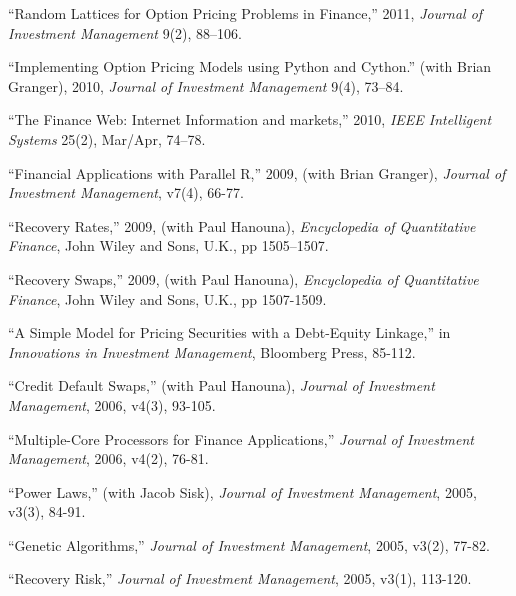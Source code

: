 \documentclass{article}
\begin{document}
\begin{etaremune}
\item ``Random Lattices for Option Pricing Problems in Finance,'' 2011, {\it Journal of Investment Management} 9(2), 88--106. 

\item ``Implementing Option Pricing Models using Python and Cython.''
(with Brian Granger), 2010, {\it Journal of Investment Management} 9(4), 73--84. 


\item ``The Finance Web: Internet Information and markets,'' 2010, {\it IEEE Intelligent Systems} 25(2), Mar/Apr, 74--78. 

\item ``Financial Applications with Parallel R,'' 2009, (with Brian Granger), {\it Journal of Investment Management}, v7(4), 66-77. 	

\item ``Recovery Rates,'' 2009, (with Paul Hanouna),
{\it Encyclopedia of Quantitative Finance}, John Wiley and Sons, U.K., pp 1505--1507.  

\item ``Recovery Swaps,'' 2009, (with Paul Hanouna), 
{\it Encyclopedia of Quantitative Finance}, John Wiley and Sons, U.K., pp 1507-1509.  

\item ``A Simple Model for Pricing Securities with a Debt-Equity Linkage,'' in 
{\it Innovations in Investment Management}, Bloomberg Press, 85-112.


\item ``Credit Default Swaps,'' (with Paul Hanouna),  
{\it Journal of Investment Management}, 2006, v4(3), 93-105. 

\item ``Multiple-Core Processors for Finance Applications,'' 
{\it Journal of Investment Management}, 2006, v4(2), 76-81.

\item ``Power Laws,'' (with Jacob Sisk), 
{\it Journal of Investment Management}, 2005, v3(3), 84-91. 

\item ``Genetic Algorithms,'' 
{\it Journal of Investment Management}, 2005, v3(2), 77-82.

\item ``Recovery Risk,''
{\it Journal of Investment Management}, 2005, v3(1), 113-120. 


\end{etaremune}
\end{document}
